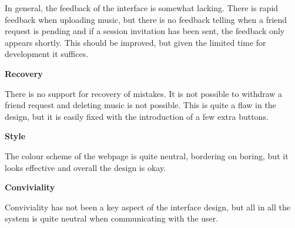 In general, the feedback of the interface is somewhat lacking. There is rapid feedback when uploading music, but there is no feedback telling when a friend request is pending and if a session invitation has been sent, the feedback only appears shortly. This should be improved, but given the limited time for development it suffices.

\textbf{Recovery}

There is no support for recovery of mistakes. It is not possible to withdraw a friend request and deleting music is not possible. This is quite a flaw in the design, but it is easily fixed with the introduction of a few extra buttons.

\textbf{Style}

The colour scheme of the webpage is quite neutral, bordering on boring, but it looks effective and overall the design is okay.

\textbf{Conviviality}

Conviviality has not been a key aspect of the interface design, but all in all the system is quite neutral when communicating with the user.